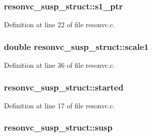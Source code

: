 \subsubsection[{\texorpdfstring{s1\+\_\+ptr}{s1_ptr}}]{ resonvc\+\_\+susp\+\_\+struct\+::s1\+\_\+ptr}\hypertarget{structresonvc__susp__struct_ab9e63e8f194c076c4600dff5b0ff3574}{}\label{structresonvc__susp__struct_ab9e63e8f194c076c4600dff5b0ff3574}


Definition at line 22 of file resonvc.\+c.

\subsubsection[{\texorpdfstring{scale1}{scale1}}]{\setlength{\rightskip}{0pt plus 5cm}double resonvc\+\_\+susp\+\_\+struct\+::scale1}\hypertarget{structresonvc__susp__struct_ab3e63f11136d289095622962473d9d4d}{}\label{structresonvc__susp__struct_ab3e63f11136d289095622962473d9d4d}


Definition at line 36 of file resonvc.\+c.

\subsubsection[{\texorpdfstring{started}{started}}]{ resonvc\+\_\+susp\+\_\+struct\+::started}\hypertarget{structresonvc__susp__struct_adac8846ea43828257e908ab1e65ce53b}{}\label{structresonvc__susp__struct_adac8846ea43828257e908ab1e65ce53b}


Definition at line 17 of file resonvc.\+c.

\subsubsection[{\texorpdfstring{susp}{susp}}]{ resonvc\+\_\+susp\+\_\+struct\+::susp}\hypertarget{structresonvc__susp__struct_ada848e1604080fcbdef4e812957bb92d}{}\label{structresonvc__susp__struct_ada848e1604080fcbdef4e812957bb92d}


